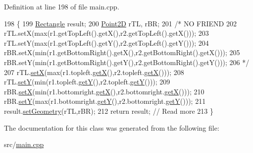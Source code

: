 Definition at line 198 of file main.\+cpp.


\begin{DoxyCode}
198                                                                \{
199     \hyperlink{classRectangle}{Rectangle} result;
200     \hyperlink{classPoint2D}{Point2D} rTL, rBR;
201     \textcolor{comment}{/* NO FRIEND}
202 \textcolor{comment}{        rTL.setX(max(r1.getTopLeft().getX(),r2.getTopLeft().getX()));}
203 \textcolor{comment}{        rTL.setY(max(r1.getTopLeft().getY(),r2.getTopLeft().getY()));}
204 \textcolor{comment}{        rBR.setX(min(r1.getBottomRight().getX(),r2.getBottomRight().getX()));}
205 \textcolor{comment}{        rBR.setY(min(r1.getBottomRight().getY(),r2.getBottomRight().getY()));}
206 \textcolor{comment}{     */}
207     rTL.\hyperlink{classPoint2D_af268842e8f2e6072ffe345dc2f322046}{setX}(max(r1.topleft.\hyperlink{classPoint2D_a5cb1c2584e5b2bada0226a3e32aa2b1a}{getX}(),r2.topleft.\hyperlink{classPoint2D_a5cb1c2584e5b2bada0226a3e32aa2b1a}{getX}()));
208     rTL.\hyperlink{classPoint2D_a0e08240b54e6eaae92c979082da1c91c}{setY}(min(r1.topleft.\hyperlink{classPoint2D_a53d10f2e460c47a493a3fbadfbafbb64}{getY}(),r2.topleft.\hyperlink{classPoint2D_a53d10f2e460c47a493a3fbadfbafbb64}{getY}()));
209     rBR.\hyperlink{classPoint2D_af268842e8f2e6072ffe345dc2f322046}{setX}(min(r1.bottomright.\hyperlink{classPoint2D_a5cb1c2584e5b2bada0226a3e32aa2b1a}{getX}(),r2.bottomright.\hyperlink{classPoint2D_a5cb1c2584e5b2bada0226a3e32aa2b1a}{getX}()));
210     rBR.\hyperlink{classPoint2D_a0e08240b54e6eaae92c979082da1c91c}{setY}(max(r1.bottomright.\hyperlink{classPoint2D_a53d10f2e460c47a493a3fbadfbafbb64}{getY}(),r2.bottomright.\hyperlink{classPoint2D_a53d10f2e460c47a493a3fbadfbafbb64}{getY}()));
211     result.\hyperlink{classRectangle_a31c4b9fc0d1ddf912f114da494e50205}{setGeometry}(rTL,rBR);
212     \textcolor{keywordflow}{return} result; \textcolor{comment}{// Read more}
213 \}
\end{DoxyCode}


The documentation for this class was generated from the following file\+:\begin{DoxyCompactItemize}
\item 
src/\hyperlink{main_8cpp}{main.\+cpp}\end{DoxyCompactItemize}
